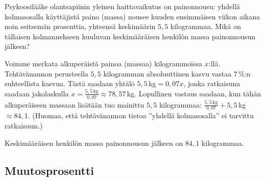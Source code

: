 
\begin{esimerkki}
Psykoosilääke olantsapiinin yleinen haittavaikutus on painonnousu: yhdellä kolmasosalla käyttäjistä paino (massa) nousee kuuden ensimmäisen viikon aikana noin seitsemän prosenttia, yhteensä keskimäärin $5,5$ kilogrammaa. Mikä on tällaisen kolmannekseen kuuluvan keskimääräisen henkilön massa painonnousun jälkeen?
	\begin{esimratk}
Voimme merkata alkuperäistä painoa (massaa) kilogrammoissa $x$:llä. Tehtävänannon perusteella $5,5$ kilogramman absoluuttinen kasvu vastaa $7$\,\%:n suhteellista kasvua. Tästä saadaan yhtälö $5,5\,$kg$=0,07x$, jonka ratkaisuna saadaan jakolaskulla $x=\frac{5,5\,\textrm{kg}}{0,07}\approx78,57$\,kg. Lopullinen vastaus saadaan, kun tähän alkuperäiseen massaan lisätään tuo mainittu $5,5$ kilogrammaa: $\frac{5,5\,\textrm{kg}}{0,07}+5,5$\,kg$\approx84,1$. (Huomaa, että tehtävänannon tietoa ''yhdellä kolmasosalla'' ei tarvittu ratkaisuun.)
	\end{esimratk}
    \begin{esimvast}
    Keskimääräisen henkilön massa painonnousun jälkeen on $84,1$ kilogrammaa.
    \end{esimvast}
\end{esimerkki}


\subsection{Muutosprosentti}


